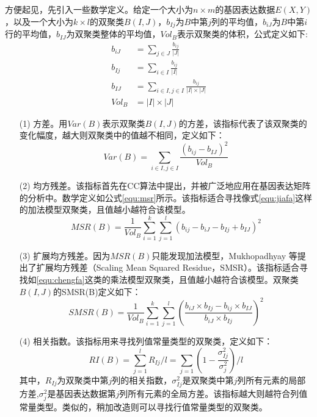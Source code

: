   方便起见，先引入一些数学定义。给定一个大小为$n\times m$的基因表达数据$E(X,Y)$，以及一个大小为$k\times l$的双聚类$B(I,J)$，$b_{Ij}$为$B$中第$j$列的平均值，$b_{iJ}$为$B$中第$i$行的平均值，$b_{IJ}$为双聚类整体的平均值，$Vol_B$表示双聚类的体积，公式定义如下:
  \begin{align}
    b_{iJ} &= \sum_{j\in J}\frac{b_{ij}}{|J|} \\
    b_{Ij} &= \sum_{i\in I}\frac{b_{ij}}{|I|} \\
    b_{IJ} &= \sum_{i\in I,j\in I}\frac{ b_{ij} }{|I| \times |J|}\\
    Vol_B &= |I| \times |J|
  \end{align}
  \begin{enumerate}
    \item[(1)] 方差。用$Var(B)$表示双聚类$B(I,J)$的方差，该指标代表了该双聚类的变化幅度，越大则双聚类中的值越不相同，定义如下：
    \begin{equation}
      Var(B) = \sum_{i\in I,j\in I}\frac{(b_{ij}-b_{IJ})^2}{Vol_B}
    \end{equation}

    \item[(2)] 均方残差。该指标首先在CC算法中提出，并被广泛地应用在基因表达矩阵的分析中。数学定义如公式\ref{equ:msr}所示。该指标适合寻找像式\ref{equ:jiafa}这样的加法模型双聚类，且值越小越符合该模型。
    \begin{equation}\label{equ:msr}
      MSR(B) = \frac{1}{Vol_B}\sum_{i=1}^k\sum_{j=1}^l(b_{ij}-b_{iJ}-b_{Ij}+b_{IJ})^2
    \end{equation}

    \item[(3)] 扩展均方残差。因为$MSR(B)$只能发现加法模型，Mukhopadhyay 等提出了扩展均方残差（Scaling Mean Squared Residue，SMSR）。该指标适合寻找如\ref{equ:chengfa}这类的乘法模型双聚类，且值越小越符合该模型。双聚类$B(I,J)$的SMSR(B)定义如下：
    \begin{equation}\label{equ:smsr}
      SMSR(B) = \frac{1}{Vol_B}\sum_{i=1}^k\sum_{j=1}^l(\frac{b_{iJ}\times b_{Ij}-b_{ij}\times b_{IJ}}{b_{iJ}\times b_{Ij}})^2
    \end{equation}

    \item[(4)] 相关指数。该指标用来寻找列值常量类型的双聚类，定义如下：
    \begin{equation}
      RI(B) = \sum_{j=1}^l R_{Ij}/l = \sum_{j=1}(1 - \frac{\sigma_{Ij}^2}{\sigma_j^2})/l
    \end{equation}
    \hspace{2em} 其中，$R_{Ij}$为双聚类中第$j$列的相关指数，$\sigma_{Ij}^2$是双聚类中第$j$列所有元素的局部方差,$\sigma_{j}^2$是基因表达数据第$j$列所有元素的全局方差。该指标越大则越符合列值常量类型。类似的，稍加改造则可以寻找行值常量类型的双聚类。


\end{enumerate}
